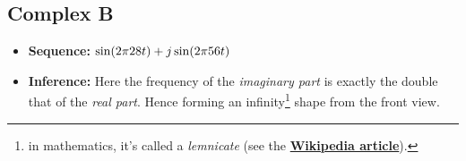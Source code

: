 \documentclass[../../course]{subfiles}
\begin{document}
\subsection{Complex B} \label{ssec:visCplxB}

\begin{itemize} [label=]

    \item \textbf{Sequence:} $\sin(2 \pi 28 t) + j \sin(2 \pi 56 t)$

    \item \textbf{Inference:} Here the frequency of the \emph{imaginary part} is exactly the
        double that of the \emph{real part}. Hence forming an infinity\footnote{in mathematics, it's
        called a \emph{lemnicate} (see the \textbf{\href{https://en.m.wikipedia.org/wiki/Lemniscate_of_Bernoulli}
        {Wikipedia article}}).} shape from the front view.

\end{itemize}

\vfill
\end{document}
